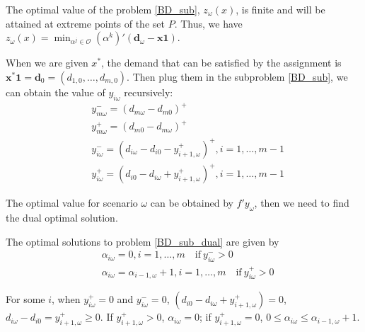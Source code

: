 \begin{corollary}
The optimal value of the problem \eqref{BD_sub}, $z_{\omega}(x)$, is finite and will be attained at extreme points of the set $P$. Thus, we have $z_{\omega}(x) = \min_{\alpha^j \in \mathcal{O}} (\alpha^{k}){'}(\mathbf{d}_{\omega}- \mathbf{x} \mathbf{1})$. 
\end{corollary}


When we are given $x^{*}$, the demand that can be satisfied by the assignment is $\mathbf{x}^{*} \mathbf{1} = \mathbf{d}_0 = (d_{1,0},\ldots,d_{m,0})$.
Then plug them in the subproblem \eqref{BD_sub}, we can obtain the value of $y_{i \omega}$ recursively:
\begin{equation}\label{y_recursively}
\begin{aligned}
  & y_{m \omega}^{-}=\left(d_{m \omega}-d_{m 0}\right)^{+} \\
  & y_{m \omega}^{+}=\left(d_{m 0}-d_{m \omega}\right)^{+} \\
  & y_{i \omega}^{-}=\left(d_{i \omega}-d_{i 0} - y_{i+1, \omega}^{+} \right)^{+}, i =1,\ldots,m-1 \\
  & y_{i \omega}^{+}=\left(d_{i 0}- d_{i \omega} + y_{i+1, \omega}^{+}\right)^{+}, i =1,\ldots,m-1
\end{aligned}
\end{equation}

The optimal value for scenario $\omega$ can be obtained by $f{'} y_{\omega}$, then we need to find the dual optimal solution.


\begin{thm}\label{optimal_sol_sub_dual}
  The optimal solutions to problem \eqref{BD_sub_dual} are given by 
\begin{equation}\label{BD_sub_simplified}
  \begin{aligned}
    & \alpha_{i \omega} =0, i =1,\ldots,m \quad \text{if}~  y_{i \omega}^{-} > 0   \\
    & \alpha_{i \omega} = \alpha_{i-1, \omega}+1, i =1,\ldots,m \quad \text{if}~ y_{i \omega}^{+} > 0
  \end{aligned}
\end{equation}
\end{thm}

For some $i$, when $y_{i \omega}^{+} = 0$ and $y_{i \omega}^{-} = 0$, $\left(d_{i 0}- d_{i \omega} + y_{i+1, \omega}^{+}\right) = 0$, $d_{i \omega}- d_{i 0} = y_{i+1, \omega}^{+} \geq 0$.
If $y_{i+1, \omega}^{+} > 0$, $\alpha_{i \omega} = 0$;
if $y_{i+1, \omega}^{+} = 0$, $0 \leq \alpha_{i \omega} \leq \alpha_{i-1, \omega} +1$.

